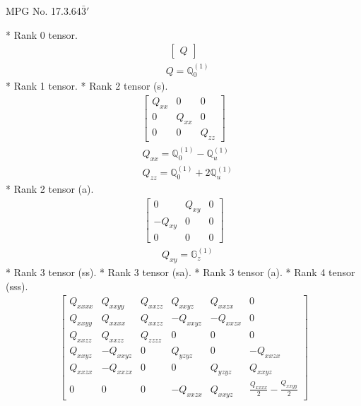 \documentclass[fleqn,8pt,landscape]{jsarticle}
\begin{document}
\setcounter{MaxMatrixCols}{32}

\renewcommand{\tablename}{Table~}
\renewcommand{\figurename}{Figure~}
\begin{center}
\LARGE
MPG No. 17.3.64\quad$\bar{3}'$
\end{center}
* Rank 0 tensor.
\begin{align*}
\begin{bmatrix} Q \end{bmatrix}
\end{align*}
\begin{align*}
& Q = \mathbb{Q}_{0}^{(1)}
\end{align*}
* Rank 1 tensor.
* Rank 2 tensor (s).
\begin{align*}
\begin{bmatrix} Q_{xx} & 0 & 0 \\ 0 & Q_{xx} & 0 \\ 0 & 0 & Q_{zz} \end{bmatrix}
\end{align*}
\begin{align*}
& Q_{xx} = \mathbb{Q}_{0}^{(1)} - \mathbb{Q}_{u}^{(1)} \\
& Q_{zz} = \mathbb{Q}_{0}^{(1)} + 2 \mathbb{Q}_{u}^{(1)}
\end{align*}
* Rank 2 tensor (a).
\begin{align*}
\begin{bmatrix} 0 & Q_{xy} & 0 \\ - Q_{xy} & 0 & 0 \\ 0 & 0 & 0 \end{bmatrix}
\end{align*}
\begin{align*}
& Q_{xy} = \mathbb{G}_{z}^{(1)}
\end{align*}
* Rank 3 tensor (ss).
* Rank 3 tensor (sa).
* Rank 3 tensor (a).
* Rank 4 tensor (sss).
\begin{align*}
\begin{bmatrix} Q_{xxxx} & Q_{xxyy} & Q_{xxzz} & Q_{xxyz} & Q_{xxzx} & 0 \\ Q_{xxyy} & Q_{xxxx} & Q_{xxzz} & - Q_{xxyz} & - Q_{xxzx} & 0 \\ Q_{xxzz} & Q_{xxzz} & Q_{zzzz} & 0 & 0 & 0 \\ Q_{xxyz} & - Q_{xxyz} & 0 & Q_{yzyz} & 0 & - Q_{xxzx} \\ Q_{xxzx} & - Q_{xxzx} & 0 & 0 & Q_{yzyz} & Q_{xxyz} \\ 0 & 0 & 0 & - Q_{xxzx} & Q_{xxyz} & \frac{Q_{xxxx}}{2} - \frac{Q_{xxyy}}{2} \end{bmatrix}
\end{align*}
\end{document}
